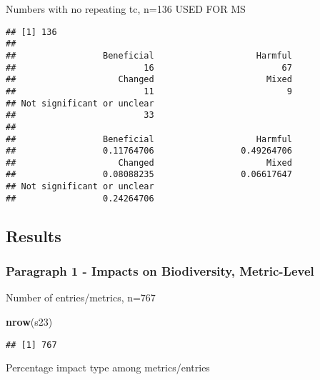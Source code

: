 \documentclass[
]{article}
\newenvironment{Shaded}{\begin{snugshade}}{\end{snugshade}}
\newcommand{\KeywordTok}[1]{\textcolor[rgb]{0.13,0.29,0.53}{\textbf{#1}}}
\newcommand{\NormalTok}[1]{#1}
\newcommand{\OperatorTok}[1]{\textcolor[rgb]{0.81,0.36,0.00}{\textbf{#1}}}
\begin{document}
Numbers with no repeating tc, n=136 USED FOR MS

\begin{Shaded}
\end{Shaded}

\begin{verbatim}
## [1] 136
## 
##                 Beneficial                    Harmful 
##                         16                         67 
##                    Changed                      Mixed 
##                         11                          9 
## Not significant or unclear 
##                         33 
## 
##                 Beneficial                    Harmful 
##                 0.11764706                 0.49264706 
##                    Changed                      Mixed 
##                 0.08088235                 0.06617647 
## Not significant or unclear 
##                 0.24264706
\end{verbatim}

\hypertarget{results}{%
\subsection{Results}\label{results}}

\hypertarget{paragraph-1---impacts-on-biodiversity-metric-level}{%
\subsubsection{Paragraph 1 - Impacts on Biodiversity,
Metric-Level}\label{paragraph-1---impacts-on-biodiversity-metric-level}}

Number of entries/metrics, n=767

\begin{Shaded}
\begin{Highlighting}[]
\KeywordTok{nrow}\NormalTok{(s23)}
\end{Highlighting}
\end{Shaded}

\begin{verbatim}
## [1] 767
\end{verbatim}

Percentage impact type among metrics/entries
\end{document}
